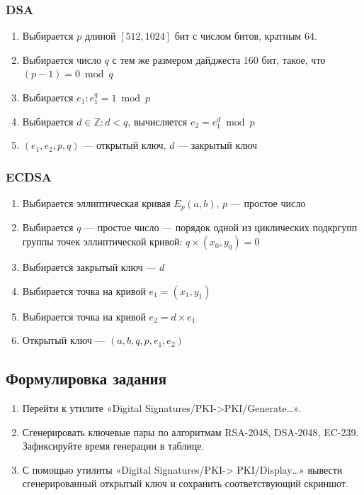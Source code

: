 \documentclass[a4paper, 14pt]{extarticle}
\begin{document}
\subsubsection{DSA}
\begin{enumerate}
    \item Выбирается $p$ длиной $[512, 1024]$ бит с числом битов, кратным $64$.
    \item Выбирается число $q$ с тем же размером дайджеста $160$ бит, такое, что $(p - 1) = 0 \bmod q$
    \item Выбирается $e_1 : e_1^q = 1 \bmod p$
    \item Выбирается $d \in \mathbb{Z}: d < q$, вычисляется $e_2 = e_1^d \bmod p$
    \item $(e_1, e_2, p, q)$ --- открытый ключ, $d$ --- закрытый ключ
\end{enumerate}

\subsubsection{ECDSA}
\begin{enumerate}
    \item Выбирается эллиптическая кривая $E_p(a,b)$, $p$ --- простое число
    \item Выбирается $q$ --- простое число --- порядок одной из циклических подкргупп группы точек эллиптической кривой: $q \times (x_0, y_0) = 0$
    \item Выбирается закрытый ключ --- $d$
    \item Выбирается точка на кривой $e_1 = (x_1, y_1)$
    \item Выбирается точка на кривой $e_2 = d \times e_1$
    \item Открытый ключ --- $(a, b, q, p, e_1, e_2)$
\end{enumerate}

\subsection{Формулировка задания}
\begin{enumerate}
    \item Перейти к утилите «Digital Signatures/PKI->PKI/Generate…».
    \item Сгенерировать ключевые пары по алгоритмам RSA-2048, DSA-2048, EC-239. Зафиксируйте время генерации в таблице.
    \item С помощью утилиты «Digital Signatures/PKI-> PKI/Display…» вывести сгенерированный открытый ключ и сохранить соответствующий скриншот.
\end{enumerate}
\end{document}
